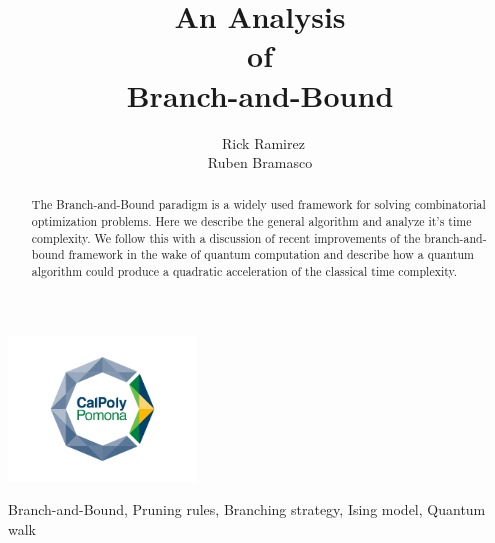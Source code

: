 \documentclass[]{IEEEphot}
\begin{document}
	
	\title{An Analysis\\ of \\ Branch-and-Bound}
	
	\author{~Rick Ramirez \\ Ruben Bramasco}
	
	\maketitle
	\vspace{-2cm}
	\begin{center}
    	\includegraphics[width=5cm]{images/primary-logo-inside-stacked}\\
    \end{center}
	\vspace{0.25cm}

	\begin{abstract}
		\doublespacing\small
		The Branch-and-Bound paradigm is a widely used framework for solving combinatorial optimization problems.
		Here we describe the general algorithm and analyze it's time complexity.
		We follow this with a discussion of recent improvements of the branch-and-bound framework in the wake of quantum computation and describe how a quantum algorithm could produce a quadratic acceleration of the classical time complexity.
	\end{abstract}

	\begin{IEEEkeywords}
		Branch-and-Bound, Pruning rules, Branching strategy, Ising model, Quantum walk
	\end{IEEEkeywords}

	
	
	
	
	
	
	
	
	
	
	
	
	
	
	
	
	
	
	\newpage
	
	
	
		
	
\end{document}
